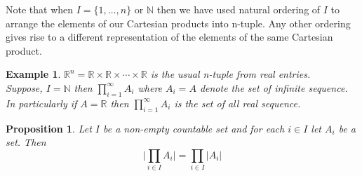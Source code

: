 \documentclass[11pt]{amsart}
\newtheorem{eg}[theorem]{Example}
\newtheorem{proposition}[theorem]{Proposition}%
\newcommand{\RR}{\mathbb R}
\newcommand{\NN}{\mathbb N}
\begin{document}
Note that when $I=\{1,\dots ,n\}$ or ${\NN}$ then we have used natural ordering of $I$ to arrange the elements of our Cartesian products into n-tuple. Any other ordering gives rise to a different representation of the elements of the same Cartesian product.
\begin{eg}
${\RR}^n={\RR}\times {\RR}\times \cdots \times {\RR}$ is the usual n-tuple from real entries.\\
Suppose, $I={\NN}$ then $\displaystyle\prod_{i=1}^{\infty} A_i$ where $A_i=A$ denote the set of infinite sequence. In particularly if $A={\RR}$ then $\displaystyle\prod_{i=1}^{\infty} A_i$ is the set of all real sequence.
\end{eg}
\begin{proposition}
Let $I$ be a non-empty countable set and for each $i\in I$ let $A_i$ be a set. Then $$\bigg|\displaystyle\prod_{i\in I} A_i \bigg|=\displaystyle\prod_{i\in I} |A_i|$$
\end{proposition}
\proof 



\newpage
\end{document}
